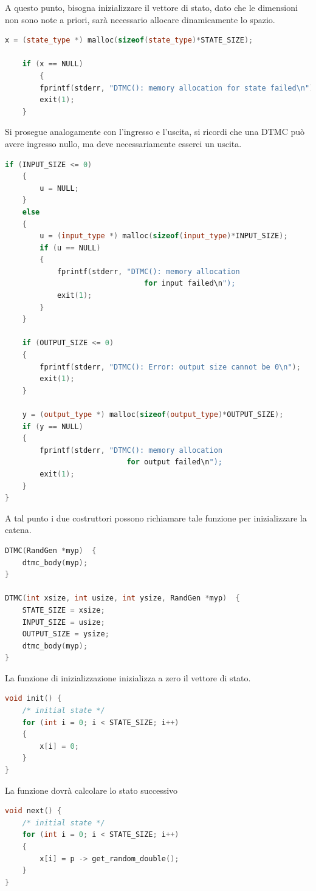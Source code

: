 \documentclass[10pt, letterpaper]{report}
\begin{document}
A questo punto, bisogna inizializzare il vettore di stato, dato che le dimensioni non sono note 
a priori, sarà necessario allocare dinamicamente lo spazio. 
\begin{lstlisting}[style=CppStyle,language=C++]
    x = (state_type *) malloc(sizeof(state_type)*STATE_SIZE);

    if (x == NULL)
        {
        fprintf(stderr, "DTMC(): memory allocation for state failed\n");
        exit(1);
    }
\end{lstlisting}
Si prosegue analogamente con l'ingresso e l'uscita, si ricordi che una DTMC può avere ingresso nullo, ma deve necessariamente esserci un uscita.
\begin{lstlisting}[style=CppStyle,language=C++]
    if (INPUT_SIZE <= 0)
    {
        u = NULL;
    }
    else
    {
        u = (input_type *) malloc(sizeof(input_type)*INPUT_SIZE);
        if (u == NULL)
        {
            fprintf(stderr, "DTMC(): memory allocation 
                                for input failed\n");
            exit(1);
        }
    }
    
    if (OUTPUT_SIZE <= 0)
    {
        fprintf(stderr, "DTMC(): Error: output size cannot be 0\n");
        exit(1);
    }

    y = (output_type *) malloc(sizeof(output_type)*OUTPUT_SIZE);
    if (y == NULL)
    {
        fprintf(stderr, "DTMC(): memory allocation 
                            for output failed\n");
        exit(1);
    }
}
\end{lstlisting}
A tal punto i due costruttori possono richiamare tale funzione per inizializzare la catena.
\begin{lstlisting}[style=CppStyle,language=C++]
DTMC(RandGen *myp)  {
    dtmc_body(myp);
}
          
DTMC(int xsize, int usize, int ysize, RandGen *myp)  {    
    STATE_SIZE = xsize;
    INPUT_SIZE = usize;
    OUTPUT_SIZE = ysize;
    dtmc_body(myp);
}
\end{lstlisting}
La funzione di inizializzazione inizializza a zero il vettore di stato.
\begin{lstlisting}[style=CppStyle,language=C++]
void init() {
    /* initial state */
    for (int i = 0; i < STATE_SIZE; i++)
    {
        x[i] = 0;
    }
}
\end{lstlisting}
La funzione  dovrà calcolare lo stato successivo
\begin{lstlisting}[style=CppStyle,language=C++]
void next() {
    /* initial state */
    for (int i = 0; i < STATE_SIZE; i++)
    {
        x[i] = p -> get_random_double();
    }
}
\end{lstlisting}
\end{document}
